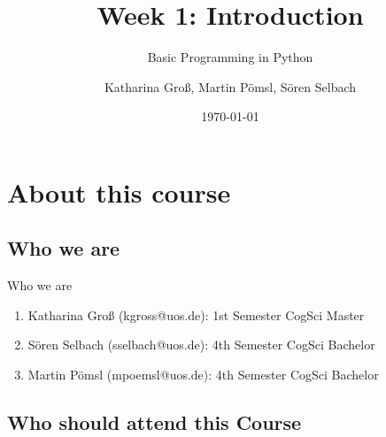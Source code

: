 
\usepackage{gensymb}

\makeatletter
{}
\tw@make@key@macro*{\OS}
\makeatother





\title[Introduction]{Week 1: Introduction}
\subtitle{Basic Programming in Python}

\author[kgross, mpoemsl, sselbach]{Katharina Groß, Martin Pömsl, Sören Selbach}

\date{\today}

\begin{frame}[plain]
    \titlepage
\end{frame}

\begin{frame}
    \tableofcontents
\end{frame}

\section{About this course}
\subsection{Who we are}

\begin{frame}{Who we are}

    \begin{enumerate}
        \item Katharina Groß (kgross@uos.de):
        \newline 1st Semester CogSci Master
        \newline
        \item Sören Selbach (sselbach@uos.de):
        \newline 4th Semester CogSci Bachelor
        \newline
        \item Martin Pömsl (mpoemsl@uos.de):
        \newline 4th Semester CogSci Bachelor
    \end{enumerate}

\end{frame}

\subsection{Who should attend this Course}

